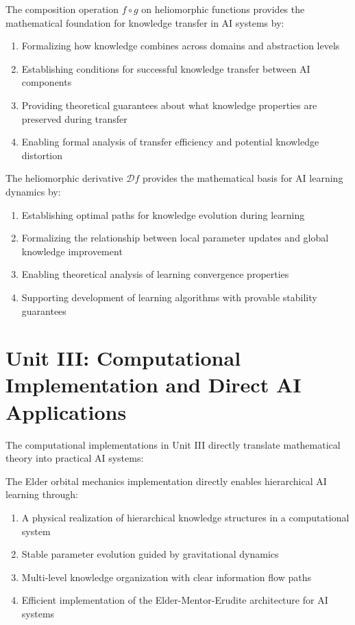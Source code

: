 \begin{theorem}
\label{thm:heliomorphic_composition_ai}
The composition operation $f \circ g$ on heliomorphic functions provides the mathematical foundation for knowledge transfer in AI systems by:
\begin{enumerate}
    \item Formalizing how knowledge combines across domains and abstraction levels
    \item Establishing conditions for successful knowledge transfer between AI components
    \item Providing theoretical guarantees about what knowledge properties are preserved during transfer
    \item Enabling formal analysis of transfer efficiency and potential knowledge distortion
\end{enumerate}
\end{theorem}

\begin{theorem}
\label{thm:heliomorphic_differentiation_ai}
The heliomorphic derivative $\mathcal{D}f$ provides the mathematical basis for AI learning dynamics by:
\begin{enumerate}
    \item Establishing optimal paths for knowledge evolution during learning
    \item Formalizing the relationship between local parameter updates and global knowledge improvement
    \item Enabling theoretical analysis of learning convergence properties
    \item Supporting development of learning algorithms with provable stability guarantees
\end{enumerate}
\end{theorem}

\section{Unit III: Computational Implementation and Direct AI Applications}

The computational implementations in Unit III directly translate mathematical theory into practical AI systems:

\begin{theorem}
\label{thm:orbital_mechanics_ai}
The Elder orbital mechanics implementation directly enables hierarchical AI learning through:
\begin{enumerate}
    \item A physical realization of hierarchical knowledge structures in a computational system
    \item Stable parameter evolution guided by gravitational dynamics
    \item Multi-level knowledge organization with clear information flow paths
    \item Efficient implementation of the Elder-Mentor-Erudite architecture for AI systems
\end{enumerate}
\end{theorem}

